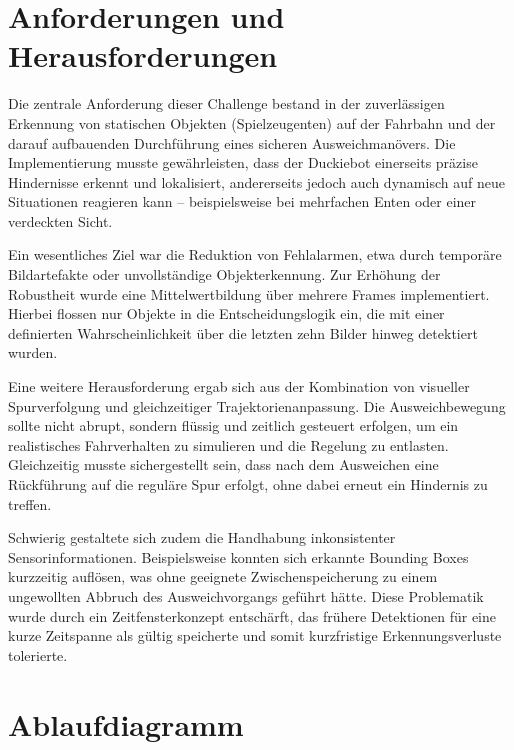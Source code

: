
\section{Anforderungen und Herausforderungen}

Die zentrale Anforderung dieser Challenge bestand in der zuverlässigen Erkennung von statischen Objekten (Spielzeugenten) auf der Fahrbahn und der darauf aufbauenden Durchführung eines sicheren Ausweichmanövers. Die Implementierung musste gewährleisten, dass der Duckiebot einerseits präzise Hindernisse erkennt und lokalisiert, andererseits jedoch auch dynamisch auf neue Situationen reagieren kann – beispielsweise bei mehrfachen Enten oder einer verdeckten Sicht.

Ein wesentliches Ziel war die Reduktion von Fehlalarmen, etwa durch temporäre Bildartefakte oder unvollständige Objekterkennung. Zur Erhöhung der Robustheit wurde eine Mittelwertbildung über mehrere Frames implementiert. Hierbei flossen nur Objekte in die Entscheidungslogik ein, die mit einer definierten Wahrscheinlichkeit über die letzten zehn Bilder hinweg detektiert wurden.

Eine weitere Herausforderung ergab sich aus der Kombination von visueller Spurverfolgung und gleichzeitiger Trajektorienanpassung. Die Ausweichbewegung sollte nicht abrupt, sondern flüssig und zeitlich gesteuert erfolgen, um ein realistisches Fahrverhalten zu simulieren und die Regelung zu entlasten. Gleichzeitig musste sichergestellt sein, dass nach dem Ausweichen eine Rückführung auf die reguläre Spur erfolgt, ohne dabei erneut ein Hindernis zu treffen.

Schwierig gestaltete sich zudem die Handhabung inkonsistenter Sensorinformationen. Beispielsweise konnten sich erkannte Bounding Boxes kurzzeitig auflösen, was ohne geeignete Zwischenspeicherung zu einem ungewollten Abbruch des Ausweichvorgangs geführt hätte. Diese Problematik wurde durch ein Zeitfensterkonzept entschärft, das frühere Detektionen für eine kurze Zeitspanne als gültig speicherte und somit kurzfristige Erkennungsverluste tolerierte.

\section{Ablaufdiagramm}


